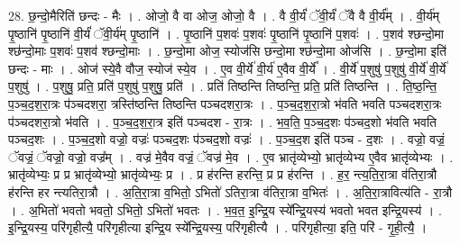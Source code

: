 \documentclass[17pt]{extarticle}
\begin{document}
28. छ॒न्दो॒मैरिति॑ छन्दः - मैः । . ओजो॒ वै वा ओज॒ ओजो॒ वै । . वै वी॒र्यं॑ ॅवी॒र्यं॑ ॅवै वै वी॒र्य᳚म् । . वी॒र्य॑म् पृ॒ष्ठानि॑ पृ॒ष्ठानि॑ वी॒र्यं॑ ॅवी॒र्य॑म् पृ॒ष्ठानि॑ । . पृ॒ष्ठानि॑ प॒शवः॑ प॒शवः॑ पृ॒ष्ठानि॑ पृ॒ष्ठानि॑ प॒शवः॑ । . प॒शव॑ श्छन्दो॒मा श्छ॑न्दो॒माः प॒शवः॑ प॒शव॑ श्छन्दो॒माः । . छ॒न्दो॒मा ओज॒ स्योज॑सि छन्दो॒मा श्छ॑न्दो॒मा ओज॑सि । . छ॒न्दो॒मा इति॑ छन्दः - माः । . ओज॑ स्ये॒वै वौज॒ स्योज॑ स्ये॒व । . ए॒व वी॒र्ये॑ वी॒र्य॑ ए॒वैव वी॒र्ये᳚ । . वी॒र्ये॑ प॒शुषु॑ प॒शुषु॑ वी॒र्ये॑ वी॒र्ये॑ प॒शुषु॑ । . प॒शुषु॒ प्रति॒ प्रति॑ प॒शुषु॑ प॒शुषु॒ प्रति॑ । . प्रति॑ तिष्ठन्ति तिष्ठन्ति॒ प्रति॒ प्रति॑ तिष्ठन्ति । . ति॒ष्ठ॒न्ति॒ प॒ञ्च॒द॒श॒रा॒त्रः प॑ञ्चदशरा॒ त्रस्ति॑ष्ठन्ति तिष्ठन्ति पञ्चदशरा॒त्रः । . प॒ञ्च॒द॒श॒रा॒त्रो भ॑वति भवति पञ्चदशरा॒त्रः प॑ञ्चदशरा॒त्रो भ॑वति । . प॒ञ्च॒द॒श॒रा॒त्र इति॑ पञ्चदश - रा॒त्रः । . भ॒व॒ति॒ प॒ञ्च॒द॒शः प॑ञ्चद॒शो भ॑वति भवति पञ्चद॒शः । . प॒ञ्च॒द॒शो वज्रो॒ वज्रः॑ पञ्चद॒शः प॑ञ्चद॒शो वज्रः॑ । . प॒ञ्च॒द॒श इति॑ पञ्च - द॒शः । . वज्रो॒ वज्रं॒ ॅवज्रं॒ ॅवज्रो॒ वज्रो॒ वज्र᳚म् । . वज्र॑ मे॒वैव वज्रं॒ ॅवज्र॑ मे॒व । . ए॒व भ्रातृ॑व्येभ्यो॒ भ्रातृ॑व्येभ्य ए॒वैव भ्रातृ॑व्येभ्यः । . भ्रातृ॑व्येभ्यः॒ प्र प्र भ्रातृ॑व्येभ्यो॒ भ्रातृ॑व्येभ्यः॒ प्र । . प्र ह॑रन्ति हरन्ति॒ प्र प्र ह॑रन्ति । . ह॒र॒ न्त्य॒ति॒रा॒त्रा व॑तिरा॒त्रौ ह॑रन्ति हर न्त्यतिरा॒त्रौ । . अ॒ति॒रा॒त्रा व॒भितो॒ ऽभितो॑ ऽतिरा॒त्रा व॑तिरा॒त्रा व॒भितः॑ । . अ॒ति॒रा॒त्रावित्य॑ति - रा॒त्रौ । . अ॒भितो॑ भवतो भवतो॒ ऽभितो॒ ऽभितो॑ भवतः । . भ॒व॒त॒ इ॒न्द्रि॒य स्ये᳚न्द्रि॒यस्य॑ भवतो भवत इन्द्रि॒यस्य॑ । . इ॒न्द्रि॒यस्य॒ परि॑गृहीत्यै॒ परि॑गृहीत्या इन्द्रि॒य स्ये᳚न्द्रि॒यस्य॒ परि॑गृहीत्यै । . परि॑गृहीत्या॒ इति॒ परि॑ - गृ॒ही॒त्यै॒ । \newline
\end{document}
